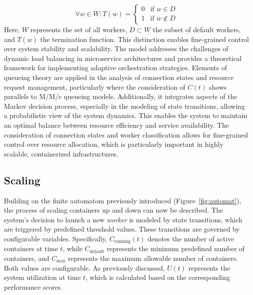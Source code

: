 \documentclass[twocolumn]{webofc}
\begin{document}
$$ \forall w \in W: T(w) = \begin{cases}
                               0 & \text{if } w \in D \\
                               1 & \text{if } w \notin D
\end{cases} $$
Here, $W$ represents the set of all workers, $D \subset W$ the subset of default workers, and $T(w)$ the termination function. This distinction enables fine-grained control over system stability and scalability. The model addresses the challenges of dynamic load balancing in microservice architectures and provides a theoretical framework for implementing adaptive orchestration strategies. Elements of queueing theory are applied in the analysis of connection states and resource request management, particularly where the consideration of $C(t)$ shows parallels to M/M/c queueing models. Additionally, it integrates aspects of the Markov decision process, especially in the modeling of state transitions, allowing a probabilistic view of the system dynamics\cite{kendall1953stochastic}. This enables the system to maintain an optimal balance between resource efficiency and service availability. The consideration of connection states and worker classification allows for fine-grained control over resource allocation, which is particularly important in highly scalable, containerized infrastructures.

\subsection{Scaling}
Building on the finite automatom previously introduced (Figure~\ref{fig:automat}), the process of scaling containers up and down can now be described. The system’s decision to launch a new \textit{worker} is modeled by state transitions, which are triggered by predefined threshold values. These transitions are governed by configurable variables. Specifically, \( C_{\text{running}}(t) \) denotes the number of active containers at time \( t \), while \( C_{\text{default}} \) represents the minimum predefined number of containers, and \( C_{\text{max}} \) represents the maximum allowable number of containers. Both values are configurable. As previously discussed, \( U(t) \) represents the system utilization at time \( t \), which is calculated based on the corresponding performance scores.
\end{document}
